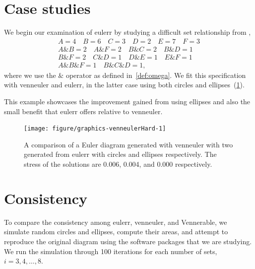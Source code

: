 \documentclass[
  a4paper,
  nofonts,
  nobib,
  nohyper,
  openany
]{tufte-book}\usepackage[]{graphicx}\usepackage[]{color}
\newenvironment{knitrout}{}{} %
\newcommand{\pkg}[1]{{\fontseries{b}\selectfont #1}}
\begin{document}
\section{Case studies}
\label{sec:caseStudies}

We begin our examination of \pkg{eulerr} by studying a difficult set relationship from \citet{wilkinson_2012},
\begin{gather*}
A = 4 \quad B = 6 \quad C = 3 \quad D = 2 \quad E = 7 \quad F = 3\\
A\& B = 2 \quad A\&F = 2 \quad B\& C = 2 \quad B\&D = 1 \\
B\& F = 2 \quad C\&D = 1 \quad D\& E = 1 \quad E\&F = 1 \\
A\&B\&F = 1 \quad B\&C\&D = 1,\end{gather*}
where we use the $\&$ operator as defined in~\cref{def:omega}. We fit this specification with \pkg{venneuler} and \pkg{eulerr}, in the latter case using both circles and ellipses~(\cref{fig:venneulerHard}).

This example showcases the improvement gained from using ellipses and also the small benefit that \pkg{eulerr} offers relative to \pkg{venneuler}.

\begin{figure}[htb]%
\begin{knitrout}
\color{fgcolor}

{\centering \texttt{[image: figure/graphics-venneulerHard-1]} 

}



\end{knitrout}
\label{fig:venneulerHard}
\caption{A comparison of a Euler diagram generated with \pkg{venneuler} with two generated from \pkg{eulerr} with circles and ellipses respectively. The stress of the solutions are 0.006, 0.004, and 0.000 respectively.}
\end{figure}

\section{Consistency}
\label{sec:consistency}

To compare the consistency among \pkg{eulerr}, \pkg{venneuler}, and \pkg{Vennerable}, we simulate random circles and ellipses, compute their areas, and attempt to reproduce the original diagram using the software packages that we are studying. We run the simulation through 100 iterations for each number of sets, $i = 3,4,\dots,8.$
\end{document}
